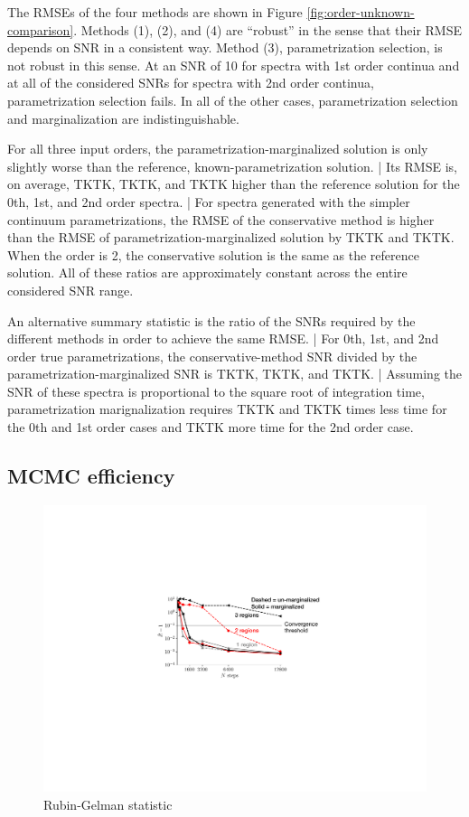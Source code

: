 \documentclass[manuscript]{aastex62}
\begin{document}
The RMSEs of the four methods are shown in Figure \ref{fig:order-unknown-comparison}.
Methods (1), (2), and (4) are ``robust'' in the sense that their RMSE depends on SNR in a consistent way.
Method (3), parametrization selection, is not robust in this sense.
At an SNR of 10 for spectra with 1st order continua and at all of the considered SNRs for spectra with 2nd order continua, parametrization selection fails.
In all of the other cases, parametrization selection and marginalization are indistinguishable.

For all three input orders, the parametrization-marginalized solution is only slightly worse than the reference, known-parametrization solution.
| Its RMSE is, on average, TKTK, TKTK, and TKTK higher than the reference solution for the 0th, 1st, and 2nd order spectra.
| For spectra generated with the simpler continuum parametrizations, the RMSE of the conservative method is higher than the RMSE of parametrization-marginalized solution by TKTK and TKTK.
When the order is 2, the conservative solution is the same as the reference solution.
All of these ratios are approximately constant across the entire considered SNR range.

An alternative summary statistic is the ratio of the SNRs required by the different methods in order to achieve the same RMSE.
| For 0th, 1st, and 2nd order true parametrizations, the conservative-method SNR divided by the parametrization-marginalized SNR is TKTK, TKTK, and TKTK.
| Assuming the SNR of these spectra is proportional to the square root of integration time, parametrization marignalization requires TKTK and TKTK times less time for the 0th and 1st order cases and TKTK more time for the 2nd order case.

\subsection{MCMC efficiency}
\label{subsec:multiple-absorption-line-test-case}

\begin{figure}
  \includegraphics{convergence.pdf}
  \caption{Rubin-Gelman statistic}
  \label{fig:convergence-comparison}
\end{figure}
\end{document}
